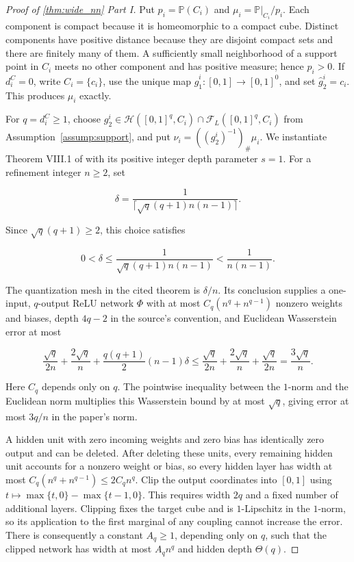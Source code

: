 \begin{proof}[Proof of \cref{thm:wide_nn} Part I]
Put $p_i=\mathbb P(C_i)$ and $\mu_i=\mathbb P|_{C_i}/p_i$. Each component is compact because it is homeomorphic to a compact cube. Distinct components have positive distance because they are disjoint compact sets and there are finitely many of them. A sufficiently small neighborhood of a support point in $C_i$ meets no other component and has positive measure; hence $p_i>0$. If $d_i^C=0$, write $C_i=\{c_i\}$, use the unique map $\hat g_1^i:[0,1]\rightarrow[0,1]^0$, and set $\hat g_2^i=c_i$. This produces $\mu_i$ exactly. 

For $q=d_i^C\geqslant1$, choose $g_2^i\in\mathcal H([0,1]^q,C_i)\cap\mathcal F_L([0,1]^q,C_i)$ from Assumption~\ref{assump:support}, and put $\nu_i=((g_2^i)^{-1})_{\#}\mu_i$. We instantiate Theorem VIII.1 of \cite{perekrestenkoHighDimensionalDistributionGeneration2022a} with its positive integer depth parameter $s=1$. For a refinement integer $n\geqslant2$, set

\[
\delta=\frac{1}{\lceil\sqrt q(q+1)n(n-1)\rceil}.
\]

Since $\sqrt q(q+1)\geqslant2$, this choice satisfies

\[
0<\delta\leqslant\frac{1}{\sqrt q(q+1)n(n-1)}<\frac{1}{n(n-1)}.
\]

The quantization mesh in the cited theorem is $\delta/n$. Its conclusion supplies a one-input, $q$-output ReLU network $\Phi$ with at most $C_q(n^q+n^{q-1})$ nonzero weights and biases, depth $4q-2$ in the source's convention, and Euclidean Wasserstein error at most

\[
\frac{\sqrt q}{2n}+\frac{2\sqrt q}{n}+\frac{q(q+1)}{2}(n-1)\delta
\leqslant\frac{\sqrt q}{2n}+\frac{2\sqrt q}{n}+\frac{\sqrt q}{2n}
=\frac{3\sqrt q}{n}.
\]

Here $C_q$ depends only on $q$. The pointwise inequality between the $1$-norm and the Euclidean norm multiplies this Wasserstein bound by at most $\sqrt q$, giving error at most $3q/n$ in the paper's norm. 

A hidden unit with zero incoming weights and zero bias has identically zero output and can be deleted. After deleting these units, every remaining hidden unit accounts for a nonzero weight or bias, so every hidden layer has width at most $C_q(n^q+n^{q-1})\leqslant2C_qn^q$. Clip the output coordinates into $[0,1]$ using $t\mapsto\max\{t,0\}-\max\{t-1,0\}$. This requires width $2q$ and a fixed number of additional layers. Clipping fixes the target cube and is $1$-Lipschitz in the $1$-norm, so its application to the first marginal of any coupling cannot increase the error. There is consequently a constant $A_q\geqslant1$, depending only on $q$, such that the clipped network has width at most $A_qn^q$ and hidden depth $\Theta(q)$. 


\end{proof}

